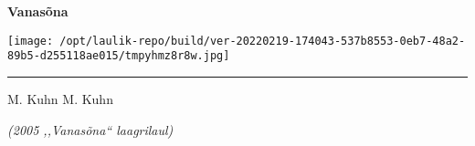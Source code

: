 \documentclass[10pt]{book}
\begin{document}
{
  \samepage
  \raggedbottom
  \raggedright
  \sloppy


  \vspace{0.2in}

  \noindent\begin{minipage}{.1\textwidth}
    \hfill\vspace{0.1in}
  \end{minipage}%
  \noindent\begin{minipage}{.8\textwidth}
    \centering
    \bfseries
    \large Vanasõna
  \end{minipage}%
  \noindent\begin{minipage}{.1\textwidth}
      \texttt{[image: /opt/laulik-repo/build/ver-20220219-174043-537b8553-0eb7-48a2-89b5-d255118ae015/tmpyhmz8r8w.jpg]}
  \end{minipage}

  \nopagebreak[4]
  \vspace{0.1in}
  \nopagebreak[4]
  \hrule height 0.05ex
  \nopagebreak[4]
  \vspace{-0.05in}

  {\footnotesize M. Kuhn \hfill M. Kuhn }\\
  \vspace{0.01in}

  {\em {\footnotesize (2005 ,,Vanas\~ona{``} laagrilaul) } }
  \vspace{0.01in}

  \vspace{0.01in}
  \nopagebreak[4]
  {%
\parindent 0pt
\noindent
\ifx\preLilyPondExample \undefined
\else
  \expandafter\preLilyPondExample
\fi
\def\lilypondbook{}%

\ifx\postLilyPondExample \undefined
\else
  \expandafter\postLilyPondExample
\fi
}

}
\end{document}
